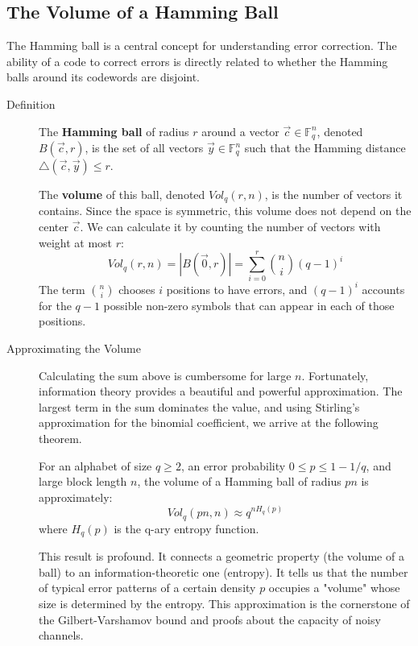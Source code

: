 \subsection{The Volume of a Hamming Ball}

The Hamming ball is a central concept for understanding error correction. The ability of a code to correct errors is directly related to whether the Hamming balls around its codewords are disjoint.

\begin{description}
    \item[Definition] The \textbf{Hamming ball} of radius $r$ around a vector $\vec{c} \in \mathbb{F}_q^n$, denoted $B(\vec{c}, r)$, is the set of all vectors $\vec{y} \in \mathbb{F}_q^n$ such that the Hamming distance $\triangle(\vec{c}, \vec{y}) \le r$.
    
    The \textbf{volume} of this ball, denoted $Vol_q(r, n)$, is the number of vectors it contains. Since the space is symmetric, this volume does not depend on the center $\vec{c}$. We can calculate it by counting the number of vectors with weight at most $r$:
    \[
        Vol_q(r, n) = |B(\vec{0}, r)| = \sum_{i=0}^r \binom{n}{i}(q-1)^i
    \]
    The term $\binom{n}{i}$ chooses $i$ positions to have errors, and $(q-1)^i$ accounts for the $q-1$ possible non-zero symbols that can appear in each of those positions.

    \item[Approximating the Volume] Calculating the sum above is cumbersome for large $n$. Fortunately, information theory provides a beautiful and powerful approximation. The largest term in the sum dominates the value, and using Stirling's approximation for the binomial coefficient, we arrive at the following theorem.

    \begin{theorem}
    For an alphabet of size $q \ge 2$, an error probability $0 \le p \le 1 - 1/q$, and large block length $n$, the volume of a Hamming ball of radius $pn$ is approximately:
    \[
        Vol_q(pn, n) \approx q^{n H_q(p)}
    \]
    where $H_q(p)$ is the q-ary entropy function.
    \end{theorem}
    This result is profound. It connects a geometric property (the volume of a ball) to an information-theoretic one (entropy). It tells us that the number of typical error patterns of a certain density $p$ occupies a "volume" whose size is determined by the entropy. This approximation is the cornerstone of the Gilbert-Varshamov bound and proofs about the capacity of noisy channels.
\end{description}
